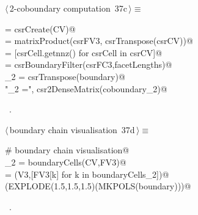 \documentclass[11pt,oneside]{article}	%
\begin{document}
\begin{flushleft} \small \label{scrap70}
\protect{}$\langle\,$2-coboundary computation\nobreak\ {\footnotesize 37c}$\,\rangle\equiv$
\vspace{-1ex}
\begin{list}{}{} \item
\mbox{}\verb@csrCV = csrCreate(CV)@\\
\mbox{} = matrixProduct(csrFV3, csrTranspose(csrCV))@\\
\mbox{}\verb@facetLengths = [csrCell.getnnz() for csrCell in csrCV]@\\
\mbox{}\verb@boundary = csrBoundaryFilter(csrFC3,facetLengths)@\\
\mbox{}\verb@coboundary_2 = csrTranspose(boundary)@\\
\mbox{}\verb@print "\ncoboundary_2 =\n", csr2DenseMatrix(coboundary_2)@\\
\mbox{}\verb@@{\NWsep}
\end{list}
\vspace{-1ex}
\footnotesize\addtolength{\baselineskip}{-1ex}
\begin{list}{}{\setlength{\itemsep}{-\parsep}\setlength{\itemindent}{-\leftmargin}}
\item \NWtxtMacroRefIn\ .
\end{list}
\end{flushleft}

\begin{flushleft} \small \label{scrap71}
\protect{}$\langle\,$boundary chain visualisation\nobreak\ {\footnotesize 37d}$\,\rangle\equiv$
\vspace{-1ex}
\begin{list}{}{} \item
\mbox{}\verb@# boundary chain visualisation@\\
\mbox{}\verb@boundaryCells_2 = boundaryCells(CV,FV3)@\\
\mbox{}\verb@boundary = (V3,[FV3[k] for k in boundaryCells_2])@\\
\mbox{}\verb@VIEW(EXPLODE(1.5,1.5,1.5)(MKPOLS(boundary)))@\\
\mbox{}\verb@@{\NWsep}
\end{list}
\vspace{-1ex}
\footnotesize\addtolength{\baselineskip}{-1ex}
\begin{list}{}{\setlength{\itemsep}{-\parsep}\setlength{\itemindent}{-\leftmargin}}
\item \NWtxtMacroRefIn\ .
\end{list}
\end{flushleft}
\end{document}
